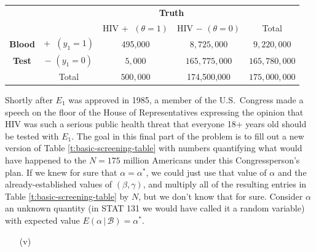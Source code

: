 \documentclass[12pt]{article}
\newcommand{\given}{\, | \,}
\begin{document}
\begin{itemize}
\begin{table}[t!]
\label{t:congressperson-table}

\bigskip

\begin{tabular}{cc|c|c|c}

& \multicolumn{1}{c}{} & \multicolumn{2}{c}{\textbf{Truth}} \\

& \multicolumn{1}{c}{} & \multicolumn{1}{c}{HIV \textcircled{+} $( \theta = 1 )$} & \multicolumn{1}{c}{HIV \textcircled{$-$} $( \theta = 0 )$}  & Total \\ \cline{3-4}

\textbf{Blood} & \textcircled{+} $( y_1 = 1 )$ & 495,000 & $ 8,725,000$ & $9,220,000$ \\ \cline{3-4}

\textbf{Test} & \textcircled{$-$} $( y_1 = 0 )$ & $5,000$ & $165,775,000$ & $165,780,000$ \\ \cline{3-4}

& \multicolumn{1}{c}{Total} & \multicolumn{1}{c}{$500,000$} & \multicolumn{1}{c}{174,500,000} & $175,000,000$

\end{tabular}

\end{table}

Shortly after $E_1$ was approved in 1985, a member of the U.S.~Congress made a speech on the floor of the House of Representatives expressing the opinion that HIV was such a serious public health threat that everyone 18+ years old should be tested with $E_1$. The goal in this final part of the problem is to fill out a new version of Table \ref{t:basic-screening-table} with numbers quantifying what would have happened to the $N = 175$ million Americans under this Congressperson's plan. If we knew for sure that $\alpha = \alpha^*$, we could just use that value of $\alpha$ and the already-established values of $( \beta, \gamma )$, and multiply all of the resulting entries in Table \ref{t:basic-screening-table} by $N$, but we don't know that for sure. Consider $\alpha$ an unknown quantity (in STAT 131 we would have called it a random variable) with expected value $E ( \alpha \given \mathcal{ B } ) = \alpha^*$. 

\begin{itemize}

\item[(v)] 


\end{itemize}
\end{itemize}
\end{document}

